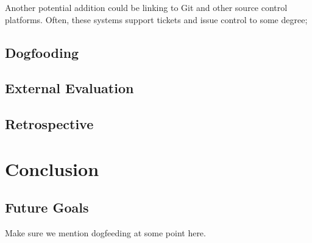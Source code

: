 \documentclass[a4paper]{l3proj}
\begin{document}
Another potential addition could be linking to Git and other source control platforms. Often, these systems support tickets and issue control to some degree; 

\section{Dogfooding}


\section{External Evaluation}


\section{Retrospective}


\chapter{Conclusion}


\section{Future Goals}

Make sure we mention dogfeeding at some point here.



\end{document}
